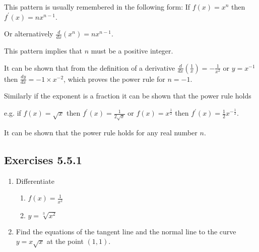 This pattern is usually remembered in the following
form: If $f (x) =x^{n}$ then $f^{ \prime } (x) =n x^{n -1}$. 

Or alternatively $\frac{d}{d x} (x^{n}) =n x^{n -1}$. 

This pattern implies that $n$ must be a positive integer. 

It can be shown that from the definition of a derivative $\frac{d}{d x} \genfrac{(}{)}{}{}{1}{x} = -\frac{1}{x^{2}}$ or $y =x^{ -1}$ then $\frac{d y}{d x} = -1 \times x^{ -2}$, which proves the power rule for $n = -1$. 

Similarly if the exponent is a fraction it can be shown that the power rule holds 

e.g.
if $f (x) =\sqrt{x}$ then $f^{ \prime } (x) =\frac{1}{2 \sqrt{x}}$ or $f (x) =x^{\frac{1}{2}}$ then $f^{ \prime } (x) =\frac{1}{2} x^{ -\frac{1}{2}}$. 

It can be shown that the power rule holds for any real number $n$. 

\subsection{Exercises 5.5.1}
\begin{enumerate}
\item Differentiate 


\begin{enumerate}
\item $f (x) =\frac{1}{x^{2}}$ 

\item $y =\sqrt[{3}]{x^{2}}$ \end{enumerate}


\item Find the equations of the
tangent line and the normal line to the curve $y =x \sqrt{x}$ at the point $(1 ,1)$. \end{enumerate}


